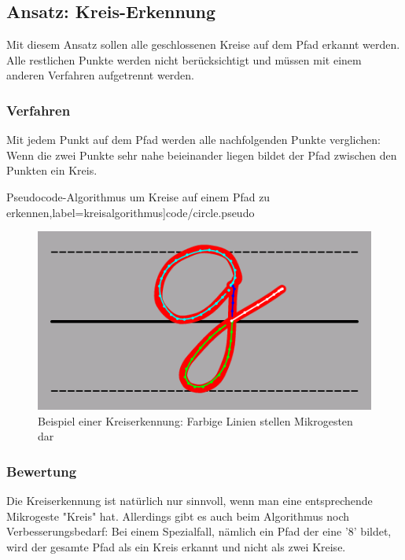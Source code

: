 
\subsection{Ansatz: Kreis-Erkennung}
Mit diesem Ansatz sollen alle geschlossenen Kreise auf dem Pfad erkannt werden. Alle restlichen Punkte werden nicht berücksichtigt und müssen mit einem anderen Verfahren aufgetrennt werden.

\subsubsection{Verfahren}
Mit jedem Punkt auf dem Pfad werden alle nachfolgenden Punkte verglichen: Wenn die zwei Punkte sehr nahe beieinander liegen bildet der Pfad zwischen den Punkten ein Kreis.

{Pseudocode-Algorithmus um Kreise auf einem Pfad zu erkennen},label=kreisalgorithmus]{code/circle.pseudo}

\begin{figure}[h!]
  \centering
    \includegraphics[scale=0.5]{./img/circle_beispiel.png}
  \caption{Beispiel einer Kreiserkennung: Farbige Linien stellen Mikrogesten dar}
  \label{kreis_trennung}
\end{figure}

\subsubsection{Bewertung}
Die Kreiserkennung ist natürlich nur sinnvoll, wenn man eine entsprechende Mikrogeste "Kreis" hat. Allerdings gibt es auch beim Algorithmus noch Verbesserungsbedarf: Bei einem Spezialfall, nämlich ein Pfad der eine '8' bildet, wird der gesamte Pfad als ein Kreis erkannt und nicht als zwei Kreise. 


